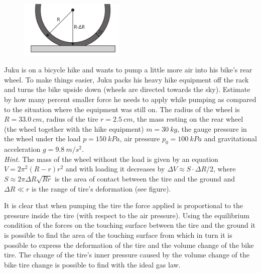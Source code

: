 \begin{figure}
	\vspace{-15pt}
	\includegraphics[width=5cm]{2017-lahg-05-fig_rattakumm}
\end{figure}
Juku is on a bicycle hike and wants to pump a little more air into his bike’s rear wheel. To make things easier, Juku packs his heavy hike equipment off the rack and turns the bike upside down (wheels are directed towards the sky). Estimate by how many percent smaller force he needs to apply while pumping as compared to the situation where the equipment was still on. The radius of the wheel is $R=\SI{33.0}{cm}$, radius of the tire $r=\SI{2.5}{cm}$, the mass resting on the rear wheel (the wheel together with the hike equipment) $m=\SI{30}{kg}$, the gauge pressure in the wheel under the load $p=\SI{150}{kPa}$, air pressure $p_{0}=\SI{100}{kPa}$ and gravitational acceleration $g=\SI{9.8}{m/s^{2}}$.\\
\emph{Hint.} The mass of the wheel without the load is given by an equation $V=2\pi^{2}\left(R-r\right)r^{2}$ and with loading it decreases by $\Delta V\approx S\cdot\Delta R/2$, where $S\approx2\pi\Delta R\sqrt{Rr}$ is the area of contact between the tire and the ground and $\Delta R\ll r$ is the range of tire’s deformation (see figure).

\hinteng
It is clear that when pumping the tire the force applied is proportional to the pressure inside the tire (with respect to the air pressure). Using the equilibrium condition of the forces on the touching surface between the tire and the ground it is possible to find the area of the touching surface from which in turn it is possible to express the deformation of the tire and the volume change of the bike tire. The change of the tire's inner pressure caused by the volume change of the bike tire change is possible to find with the ideal gas law.

